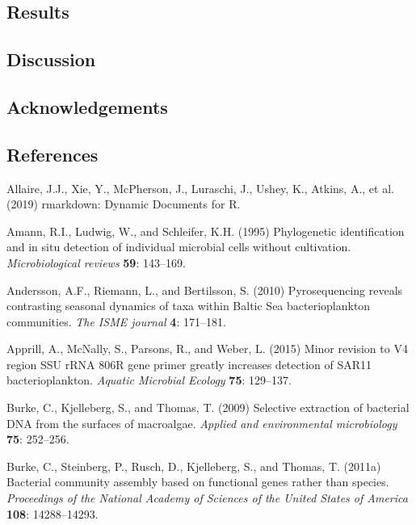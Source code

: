 \documentclass[12pt,]{article}
\begin{document}
\subsection{Results}\label{results}

\subsection{Discussion}\label{discussion}

\subsection{Acknowledgements}\label{acknowledgements}

\newpage

\subsection{References}\label{references}

\hypertarget{refs}{}
\hypertarget{ref-Allaire2019}{}
Allaire, J.J., Xie, Y., McPherson, J., Luraschi, J., Ushey, K., Atkins,
A., et al. (2019) rmarkdown: Dynamic Documents for R.

\hypertarget{ref-Amann1995}{}
Amann, R.I., Ludwig, W., and Schleifer, K.H. (1995) Phylogenetic
identification and in situ detection of individual microbial cells
without cultivation. \emph{Microbiological reviews} \textbf{59}:
143--169.

\hypertarget{ref-Andersson2010}{}
Andersson, A.F., Riemann, L., and Bertilsson, S. (2010) Pyrosequencing
reveals contrasting seasonal dynamics of taxa within Baltic Sea
bacterioplankton communities. \emph{The ISME journal} \textbf{4}:
171--181.

\hypertarget{ref-Apprill2015}{}
Apprill, A., McNally, S., Parsons, R., and Weber, L. (2015) Minor
revision to V4 region SSU rRNA 806R gene primer greatly increases
detection of SAR11 bacterioplankton. \emph{Aquatic Microbial Ecology}
\textbf{75}: 129--137.

\hypertarget{ref-Burke2009}{}
Burke, C., Kjelleberg, S., and Thomas, T. (2009) Selective extraction of
bacterial DNA from the surfaces of macroalgae. \emph{Applied and
environmental microbiology} \textbf{75}: 252--256.

\hypertarget{ref-Burke2011a}{}
Burke, C., Steinberg, P., Rusch, D., Kjelleberg, S., and Thomas, T.
(2011a) Bacterial community assembly based on functional genes rather
than species. \emph{Proceedings of the National Academy of Sciences of
the United States of America} \textbf{108}: 14288--14293.
\end{document}
